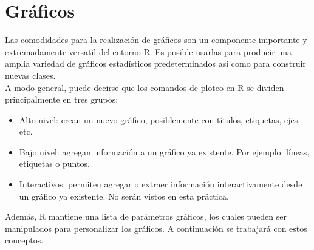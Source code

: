 \documentclass{prob}
\begin{document}
\section*{Gráficos}
Las comodidades para la realización de gráficos son un componente importante y extremadamente versatil del entorno R. Es posible usarlas para producir una amplia variedad de gráficos estadísticos predeterminados así como para construir nuevas clases.\\
A modo general, puede decirse que los comandos de ploteo en R se dividen principalmente en tres grupos:
\begin{itemize}
	\item Alto nivel: crean un nuevo gráfico, posiblemente con títulos, etiquetas, ejes, etc.
	\item Bajo nivel: agregan información a un gráfico ya existente. Por ejemplo: líneas, etiquetas o puntos.
	\item Interactivos: permiten agregar o extraer información interactivamente desde un gráfico ya existente. No serán vistos en esta práctica.
\end{itemize}
Además, R mantiene una lista de parámetros gráficos, los cuales pueden ser manipulados para personalizar los gráficos. A continuación se trabajará con estos conceptos.
\end{document}
